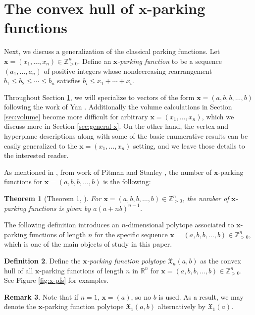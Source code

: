 \documentclass[11pt]{amsart}
\newtheorem{theorem}{Theorem}[section]
\theoremstyle{definition}
\newtheorem{remark}[theorem]{Remark}
\newtheorem{definition}[theorem]{Definition}
\newcommand{\0}{\emptyset}
\newcommand{\R}{\mathbb{R}}
\newcommand{\Z}{\mathbb{Z}}
\newcommand{\bx}{\mathbf{x}}
\newcommand{\X}{\mathfrak{X}}
\newcommand{\Xn}{\mathfrak{X}_{n}(a,b)}
\begin{document}
\section{The convex hull of \texorpdfstring{$\mathbf{x}$}{\textbf{x}}-parking functions}\label{sec:x-parking}

Next, we discuss a generalization of the classical parking functions.
Let $\bx=(x_1,\dots,x_n)\in \Z_{>0}^n$. 
Define an $\bx$\emph{-parking function} to be a sequence $(a_1,\dots,a_n)$ of positive integers whose nondecreasing rearrangement $b_1\leq b_2\leq \cdots \leq b_n$ satisfies $b_i\leq x_1+\cdots + x_i$. 

Throughout Section \ref{sec:x-parking}, we will specialize to vectors of the form $\bx=(a,b,b,\dots,b)$ following the work of Yan \cite{Yan2, Yan}. Additionally the volume calculations in Section \ref{sec:volume} become more difficult for arbitrary $\bx=(x_1,\dots,x_n)$, which we discuss more in Section \ref{sec:general-x}. On the other hand, the vertex and hyperplane descriptions along with some of the basic enumerative results can be easily generalized to the $\bx=(x_1,\dots,x_n)$ setting, and we leave those details to the interested reader.  

As mentioned in \cite{Yan}, from work of Pitman and Stanley \cite{PitmanStanley}, the number of $\bx$-parking functions for $\bx=(a,b,b,\ldots,b)$ is the following:

\begin{theorem}[Theorem 1, \cite{Yan}]\label{thm:number_x-parking}
For $\mathbf{x}=(a,b,b,\ldots,b) \in \Z_{>0}^n$, the number of $\bx$-parking functions is given by $a(a+nb)^{n-1}$.
\end{theorem}


The following definition introduces an  $n$-dimensional polytope associated to $\bx$-parking functions of length $n$ for the specific sequence $\bx=(a,b,b,\dots,b)\in \Z_{>0}^n$, which is one of the main objects of study in this paper. 

\begin{definition}
Define the \emph{$\bx$-parking function polytope} $\Xn$ as the convex hull of all $\bx$-parking functions of length $n$ in $\R^n$ for $\bx=(a,b,b,\dots,b)\in \Z_{>0}^n$. See Figure \ref{fig:x-pfs} for examples. 
\end{definition}

\begin{remark}\label{rem:n=1}
Note that if $n=1$, $\bx = (a)$, so no $b$ is used. 
As a result, we may denote the $\bx$-parking function polytope $\X_{1}(a,b)$ alternatively by $\X_{1}(a)$.
\end{remark}
\end{document}
